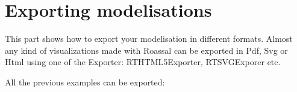 \documentclass[a4paper,10pt,twoside]{book}
\begin{document}
\fi
\sloppy

\chapter{Exporting modelisations}
This part shows how to export your modelisation in different formats. Almost any kind of visualizations made with Roassal can be exported in Pdf, Svg or Html using one of the Exporter: RTHTML5Exporter, RTSVGExporer etc. 

All the previous examples can be exported:



\ifx\wholebook\relax\else
   
\end{document}
